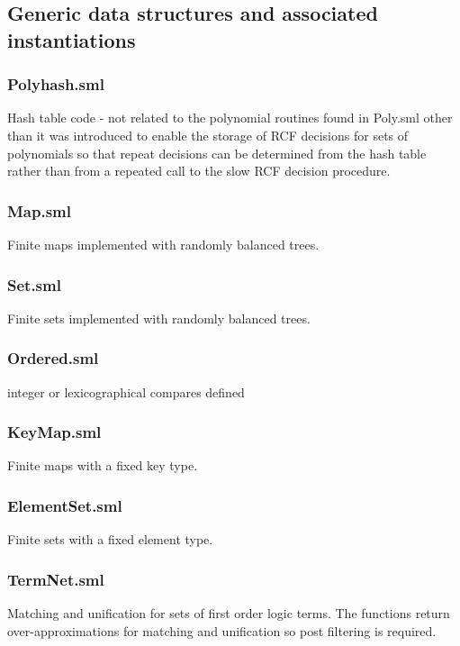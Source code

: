 \documentclass[11pt, oneside]{article}   	%
\begin{document}
\subsection{Generic data structures and associated instantiations}
\subsubsection{Polyhash.sml}
Hash table code - not related to the polynomial routines found in Poly.sml other than it was introduced to enable the storage of RCF decisions for sets of polynomials so that
repeat decisions can be determined from the hash table rather than from a repeated call to the slow RCF decision procedure.

\subsubsection{Map.sml}

Finite maps implemented with randomly balanced trees.

\subsubsection{Set.sml}

Finite sets implemented with randomly balanced trees.

\subsubsection{Ordered.sml}
integer or lexicographical compares defined

\subsubsection{KeyMap.sml}

Finite maps with a fixed key type.

\subsubsection{ElementSet.sml}

Finite sets with a fixed element type.

\subsubsection{TermNet.sml}

Matching and unification for sets of first order logic terms. The functions return over-approximations for matching
and unification so post filtering is required.
\end{document}
